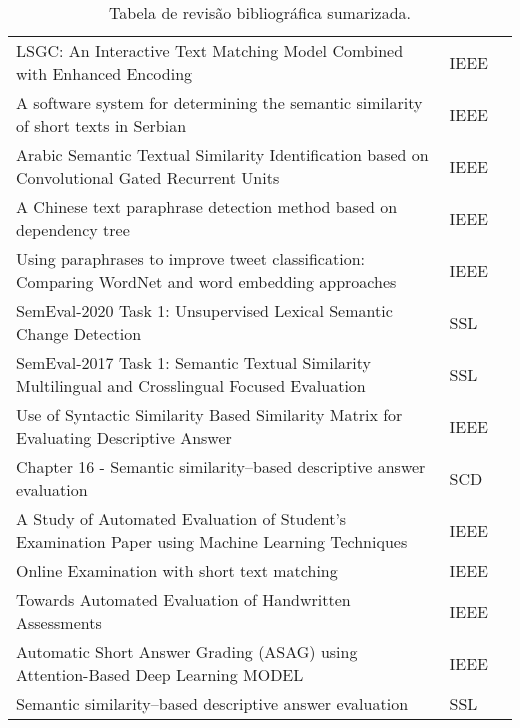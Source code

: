 \begin{table}[htb!]
{\begin{tabular}{@{}lll@{}}
LSGC: An Interactive Text Matching Model Combined with Enhanced Encoding & IEEE & \cite{LSGCInteractiveTextMatchingModelEnhancedEncoding} \\
A software system for determining the semantic similarity of short texts in Serbian & IEEE & \cite{SoftwareSystemSemanticSimilarityShortTextSerbian} \\
Arabic Semantic Textual Similarity Identification based on Convolutional Gated Recurrent Units & IEEE & \cite{ArabicSemanticTextualSimilarityConvolutionalGatedRecurrentUnits} \\
A Chinese text paraphrase detection method based on dependency tree & IEEE & \cite{ChineseParaphraseDetectionBasedDependencyTree} \\
Using paraphrases to improve tweet classification: Comparing WordNet and word embedding approaches & IEEE & \cite{UsingParaphrasesTweetClassificationComparingWordNetAndWordEmbedding} \\
\rowcolor{Gray} SemEval-2020 Task 1: Unsupervised Lexical Semantic Change Detection & SSL & \cite{UnsupervisedLexicalSemanticChangeDetection} \\
SemEval-2017 Task 1: Semantic Textual Similarity Multilingual and Crosslingual Focused Evaluation & SSL & \cite{SemanticTextualSimilarityMultilingualCrosslingualFocusedEvaluation} \\
\rowcolor{Gray} Use of Syntactic Similarity Based Similarity Matrix for Evaluating Descriptive Answer & IEEE & \cite{SyntacticSimilarityBasedSimilarityMatrixForEvaluatingDescriptiveAnswer} \\
\rowcolor{Gray} Chapter 16 - Semantic similarity–based descriptive answer evaluation & SCD & \cite{SemanticSimilarityBasedDescriptiveAnswerEvaluation} \\
\rowcolor{Gray} A Study of Automated Evaluation of Student’s Examination Paper using Machine Learning Techniques & IEEE & \cite{StudyAutomatedEvaluationStudentsExaminationPaperMachineLearningTechniques} \\
Online Examination with short text matching & IEEE & \cite{OnlineExaminationWithShortTextMatching} \\
Towards Automated Evaluation of Handwritten Assessments & IEEE & \cite{TowardsAutomatedEvaluationHandwrittenAssessments} \\
Automatic Short Answer Grading (ASAG) using Attention-Based Deep Learning MODEL & IEEE & \cite{AutomaticShortAnswerGrading-ASAG-usingAttentionBasedDeepLearningMODEL} \\
Semantic similarity–based descriptive answer evaluation & SSL & \cite{SemanticSimilarityBasedDescriptiveAnswerEvaluation} \\ \bottomrule
\end{tabular}%
}
\caption{Tabela de revisão bibliográfica sumarizada.}
\label{table:1}
\end{table}


